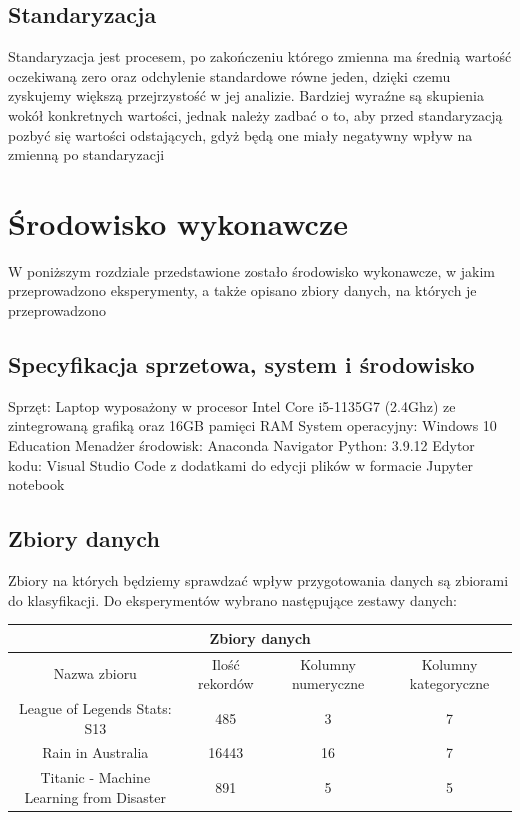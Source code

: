\documentclass{book}
\begin{document}
\section{Standaryzacja}
Standaryzacja jest procesem, po zakończeniu którego zmienna 
ma średnią wartość oczekiwaną zero oraz odchylenie standardowe 
równe jeden, dzięki czemu zyskujemy większą przejrzystość w 
jej analizie. Bardziej wyraźne są skupienia wokół konkretnych 
wartości, jednak należy zadbać o to, aby przed standaryzacją 
pozbyć się wartości odstających, gdyż będą one miały negatywny 
wpływ na zmienną po standaryzacji



\chapter{Środowisko wykonawcze}

W poniższym rozdziale przedstawione zostało środowisko wykonawcze, 
w jakim przeprowadzono eksperymenty, a także opisano zbiory danych, 
na których je przeprowadzono
\section{Specyfikacja sprzetowa, system i środowisko}
Sprzęt: Laptop wyposażony w procesor Intel Core i5-1135G7 
(2.4Ghz) ze zintegrowaną grafiką oraz 16GB pamięci RAM
System operacyjny: Windows 10 Education
Menadżer środowisk: Anaconda Navigator
Python: 3.9.12
Edytor kodu: Visual Studio Code z dodatkami do edycji plików w 
formacie Jupyter notebook
\section{Zbiory danych}
Zbiory na których będziemy sprawdzać wpływ przygotowania danych 
są zbiorami do klasyfikacji. Do eksperymentów wybrano następujące 
zestawy danych:

\begin{center}
    \begin{tabular}{ |c|c|c|c| } 
    \hline
    \multicolumn{4}{|c|}{Zbiory danych} \\
    \hline
    Nazwa zbioru & Ilość rekordów & Kolumny numeryczne & Kolumny kategoryczne \\
     \hline
     League of Legends Stats: S13 & 485 & 3 & 7\\ 
     Rain in Australia & 16443 & 16 & 7\\ 
     Titanic - Machine Learning from Disaster & 891 & 5 & 5\\ 
     \hline
    \end{tabular}
    \end{center}
\end{document}
